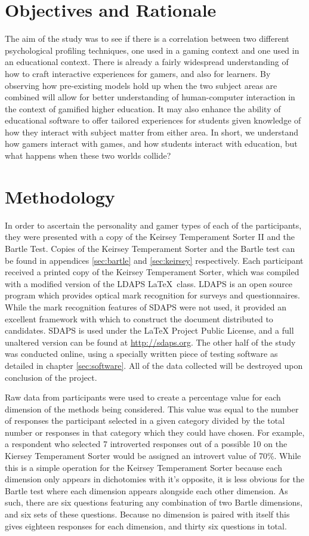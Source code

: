 \documentclass[12pt,a4paper,twoside]{report}
\begin{document}
\section{Objectives and Rationale}
The aim of the study was to see if there is a correlation between two different psychological profiling techniques, one used in a gaming context and one used in an educational context. There is already a fairly widespread understanding of how to craft interactive experiences for gamers, and also for learners. By observing how pre-existing models hold up when the two subject areas are combined will allow for better understanding of human-computer interaction in the context of gamified higher education. It may also enhance the ability of educational software to offer tailored experiences for students given knowledge of how they interact with subject matter from either area. In short, we understand how gamers interact with games, and how students interact with education, but what happens when these two worlds collide?

\section{Methodology}
In order to ascertain the personality and gamer types of each of the participants, they were presented with a copy of the Keirsey Temperament Sorter II and the Bartle Test. Copies of the Keirsey Temperament Sorter and the Bartle test can be found in appendices \ref{sec:bartle} and \ref{sec:keirsey} respectively. Each participant received a printed copy of the Keirsey Temperament Sorter, which was compiled with a modified version of the LDAPS  \LaTeX \ class. LDAPS is an open source program which provides optical mark recognition for surveys and questionnaires. While the mark recognition features of SDAPS were not used, it provided an excellent framework with which to construct the document distributed to candidates. SDAPS is used under the LaTeX Project Public License, and a full unaltered version can be found at \url{http://sdaps.org}. The other half of the study was conducted online, using a specially written piece of testing software as detailed in chapter \ref{sec:software}. All of the data collected will be destroyed upon conclusion of the project.

Raw data from participants were used to create a percentage value for each dimension of the methods being considered. This value was equal to the number of responses the participant selected in a given category divided by the total number or responses in that category which they could have chosen. For example, a respondent who selected 7 introverted responses out of a possible 10 on the Kiersey Temperament Sorter would be assigned an introvert value of 70\%. While this is a simple operation for the Keirsey Temperament Sorter because each dimension only appears in dichotomies with it's opposite, it is less obvious for the Bartle test where each dimension appears alongside each other dimension. As such, there are six questions featuring any combination of two Bartle dimensions, and six sets of these questions. Because no dimension is paired with itself this gives eighteen responses for each dimension, and thirty six questions in total.
\end{document}
